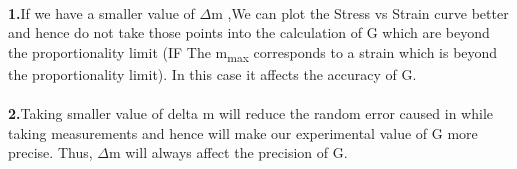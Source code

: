 \documentclass[12pt,a4paper]{article}	%
\begin{document}
\\
\textbf{1.}If we have a smaller value of $\Delta$m ,We can plot the Stress vs Strain curve better and hence do not take those points into the calculation of G which are beyond the proportionality limit (IF The m\textsubscript{max} corresponds to a strain which is beyond the proportionality limit). In this case it affects the accuracy of G.\\
\\
\textbf{2.}Taking smaller value of delta m will reduce the random error caused in while taking measurements and hence will make our experimental value  of G more precise. Thus, $\Delta$m will always affect the precision of G.
\thispagestyle{empty}	%
\end{document}
